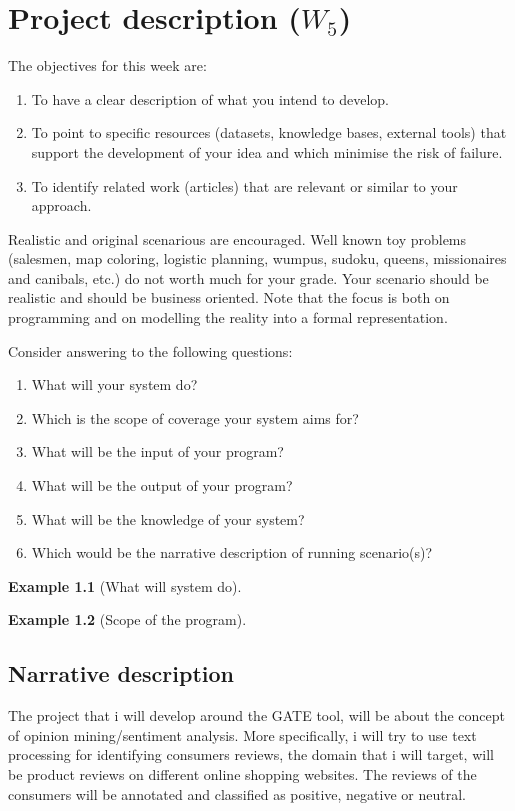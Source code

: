 \documentclass[a4paper,12pt]{report}
\newtheorem{example}{Example}
\begin{document}
\chapter{Project description ($W_5$)}
The objectives for this week are:
\begin{enumerate}
 \item To have a clear description of what you intend to develop.
\item To point to specific resources (datasets, knowledge bases, external tools) 
that support the development of your idea and which minimise the risk of failure.
\item To identify related work (articles) that are relevant or similar to your approach.
\end{enumerate}


Realistic and original scenarious are encouraged. 
Well known toy problems (salesmen, map coloring, logistic planning, wumpus, sudoku, queens, missionaires and canibals, etc.) do not worth much for your grade. 
Your scenario should be realistic and should be business oriented. 
Note that the focus is both on programming and on modelling the reality into a formal representation.

Consider answering to the following questions:
\begin{enumerate}
 \item What will your system do?
\item Which is the scope of coverage your system aims for?
\item What will be the input of your program?
\item What will be the output of your program?
\item What will be the knowledge of your system?
\item Which would be the narrative description of running scenario(s)?
\end{enumerate}

\begin{example}[What will system do]
 
\end{example}

\begin{example}[Scope of the program]
 
\end{example}


\section{Narrative description}
The project that i will develop around the GATE tool, will be about the concept of opinion mining/sentiment analysis. More specifically, i will try to use text processing for identifying consumers reviews, the domain that i will target, will be product reviews on different online shopping websites. The reviews of the consumers will be annotated and classified as positive, negative or neutral. 
\end{document}
